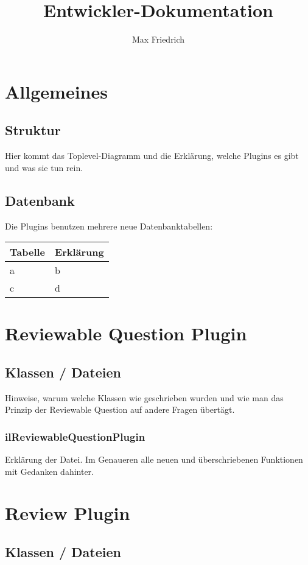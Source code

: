 \documentclass[12pt,a4paper]{scrreprt}
\author{Max Friedrich}
\title{Entwickler-Dokumentation}
\begin{document}
\tableofcontents

\chapter{Allgemeines}

\section{Struktur}
Hier kommt das Toplevel-Diagramm und die Erklärung, welche Plugins es gibt und was sie tun rein.

\section{Datenbank}
Die Plugins benutzen mehrere neue Datenbanktabellen:

\begin{center}
	\begin{tabular}{l  l}
		Tabelle & Erklärung \\ 
		\hline
		a & b \\
		c & d \\ 
		\hline
	\end{tabular}
\end{center}

\chapter{Reviewable Question Plugin}

\section{Klassen / Dateien}
Hinweise, warum welche Klassen wie geschrieben wurden und wie man das Prinzip der Reviewable Question auf andere Fragen übertägt.

\subsection{ilReviewableQuestionPlugin}
Erklärung der Datei. Im Genaueren alle neuen und überschriebenen Funktionen mit Gedanken dahinter.

\chapter{Review Plugin}

\section{Klassen / Dateien}
\end{document}
